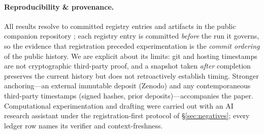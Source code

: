 \documentclass[11pt]{article}
\theoremstyle{definition}
\theoremstyle{remark}
\begin{document}
\paragraph{Reproducibility \& provenance.} All results resolve to committed registry
entries and artifacts in the public companion repository \cite{ledger2026}; each
registry entry is committed \emph{before} the run it governs, so the evidence that
registration preceded experimentation is the \emph{commit ordering} of the public
history. We are explicit about its limits: git and hosting timestamps are not
cryptographic third-party proof, and a snapshot taken \emph{after} completion
preserves the current history but does not retroactively establish timing. Stronger
anchoring---an external immutable deposit (Zenodo) and any contemporaneous
third-party timestamps (signed hashes, prior deposits)---accompanies the paper.
Computational experimentation and drafting were carried out with an AI research
assistant under the registration-first protocol of \S\ref{sec:negatives}; every
ledger row names its verifier and context-freshness.
\end{document}
